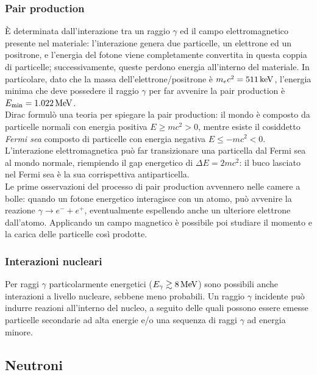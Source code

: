 \subsubsection{Pair production}

È determinata dall'interazione tra un raggio $ \gamma $ ed il campo elettromagnetico presente nel materiale: l'interazione genera due particelle, un elettrone ed un positrone, e l'energia del fotone viene completamente convertita in questa coppia di particelle; successivamente, queste perdono energia all'interno del materiale. In particolare, dato che la massa dell'elettrone/positrone è $ m_ec^2 = 511\,\mathrm{keV} $, l'energia minima che deve possedere il raggio $ \gamma $ per far avvenire la pair production è $ E_{\text{min}} = 1.022\,\mathrm{MeV} $.\\
Dirac formulò una teoria per spiegare la pair production: il mondo è composto da particelle normali con energia positiva $ E \ge m c^2 > 0 $, mentre esiste il cosiddetto \textit{Fermi sea} composto di particelle con energia negativa $ E \le - m c^2 < 0 $. L'interazione elettromagnetica può far transizionare una particella dal Fermi sea al mondo normale, riempiendo il gap energetico di $ \Delta E = 2mc^2 $: il buco lasciato nel Fermi sea è la sua corrispettiva antiparticella.\\
Le prime osservazioni del processo di pair production avvennero nelle camere a bolle: quando un fotone energetico interagisce con un atomo, può avvenire la reazione $ \gamma \rightarrow e^- + e^+ $, eventualmente espellendo anche un ulteriore elettrone dall'atomo. Applicando un campo magnetico è possibile poi studiare il momento e la carica delle particelle così prodotte.

\subsubsection{Interazioni nucleari}

Per raggi $ \gamma $ particolarmente energetici ($ E_{\gamma} \gtrsim 8\,\mathrm{MeV} $) sono possibili anche interazioni a livello nucleare, sebbene meno probabili. Un raggio $ \gamma $ incidente può indurre reazioni all'interno del nucleo, a seguito delle quali possono essere emesse particelle secondarie ad alta energie e/o una sequenza di raggi $ \gamma $ ad energia minore.

\subsection{Neutroni}

